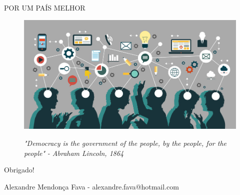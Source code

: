 \documentclass{Alexandre}
\begin{document}
\begin{frame}{POR UM PAÍS MELHOR}

    \begin{figure}
        \includegraphics[scale = 1.0]{Figuras/Conectados-pela-internet.jpg}
    \end{figure}

\end{frame}


\begin{frame}
    \begin{center}
        \begin{figure}{\textit{"Democracy is the government of the people, by the people, for the people"}}
            \textit{ - Abraham Lincoln, 1864}
        \end{figure}
    \vspace{1.5cm}

    \begin{Huge} 
    Obrigado!\\
    \end{Huge}
    \bigskip
    Alexandre Mendonça Fava - \alert{alexandre.fava@hotmail.com}\\
    \end{center}
\end{frame}
\end{document}
